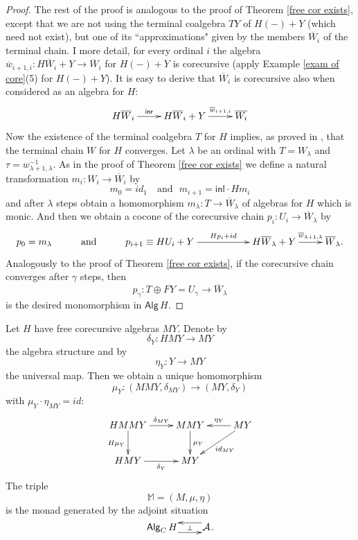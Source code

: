 \documentclass{LMCS}
\theoremstyle{plain}
\theoremstyle{definition}
\numberwithin{equation}{section}
\begin{document}
\begin{proof}
The rest of the proof is analogous to the proof of Theorem
\ref{free cor exists}, except that we are not using the terminal
coalgebra $TY$ of $H(-)+Y$ (which need not exist), but one of its
``approximations" given by the members $\overline W_i$ of the terminal
chain. I more detail, for every ordinal $i$ the algebra $\overline
w_{i+1,i}:H\overline W_i+Y\rightarrow \overline W_i$ for $H(-)+Y$ is
corecursive (apply Example \ref{exam of core}(5) for $H(-)+Y$). It is
easy to derive that $\overline W_i$ is corecursive also when
considered as an algebra for $H$:
$$\xymatrix{
H\overline W_i\ar[r]^-{\mathsf{inr}} &H\overline W_i+Y\ar[r]^-{\overline w_{i+1,i}}& \overline{W_i}
}$$
Now the existence of the terminal coalgebra $T$ for $H$ implies, as proved in \cite{ak2}, that the terminal chain $W$ for $H$ converges. Let $\lambda$ be an ordinal with $T=W_\lambda$ and $\tau=w^{-1}_{\lambda+1,\lambda}$. As in the proof of Theorem \ref{free cor exists} we define a natural transformation $m_i:W_i\rightarrow \overline W_i$ by $$m_0=id_1\ \ \ \text{ and} \ \ \ m_{i+1}=\mathsf{inl}\cdot Hm_i$$
and after $\lambda$ steps obtain a homomorphism
$m_\lambda:T\rightarrow \overline W_\lambda$ of algebras for $H$ which is monic. And then we obtain a cocone of the corecursive chain $p_i:U_i\rightarrow \overline W_\lambda$ by
$$\xymatrix{ p_0 = m_\lambda &{\rm and}& p_{i+1}\equiv HU_i+Y\ar[rr]^-{Hp_i+id}&&H\overline W_\lambda+Y\ar[r]^-{\overline w_{\lambda+1,\lambda}}&\overline W_\lambda.}$$
Analogously to the proof of Theorem \ref{free cor exists}, if the corecursive chain converges after $\gamma$ steps, then
$$p_\gamma:T\oplus FY=U_\gamma\rightarrow \overline W_\lambda$$
is the desired monomorphism in $\mathsf{Alg}\,H$.
\end{proof}

\begin{nota}\label{4.13}
Let $H$ have free corecursive algebras $MY$. Denote by $$\delta_Y:HMY\rightarrow MY$$ the algebra structure and by $$\eta_Y:Y\rightarrow MY$$ the universal map. Then we obtain a unique homomorphism $$\mu_Y:(MMY,\delta_{MY})\rightarrow (MY,\delta_Y)$$ with $\mu_Y\cdot\eta_{MY}=id$:
\begin{equation}\label{mu is homo}\vcenter{
\xymatrix{
HMMY\ar[r]^-{\delta_{MY}}\ar[d]_{H\mu_Y}&MMY\ar[d]^{\mu_Y}&MY\ar[l]_-{\eta_Y}\ar[ld]^{id_{MY}}\\
HMY\ar[r]_-{\delta_Y}&MY
}}
\end{equation}
The triple $$\mathbb{M}=(M,\mu,\eta)$$ is the monad generated by the adjoint situation  
$$
\xymatrix@1{
\mathsf{Alg}_C\,H \ar@<-5pt>[r] 
\ar@{}[r]|-\perp
& 
\mathcal A
\ar@<-5pt>[l]
}.
$$
\end{nota}
\end{document}
